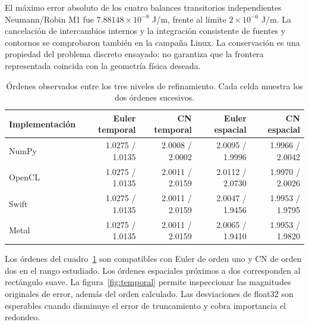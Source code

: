 \documentclass[11pt,a4paper]{article}
\begin{document}
El máximo error absoluto de los cuatro balances transitorios independientes Neumann/Robin M1 fue $7.88148\times10^{-8}$ J/m, frente al límite $2\times10^{-6}$ J/m. La cancelación de intercambios internos y la integración consistente de fuentes y contornos se comprobaron también en la campaña Linux. La conservación es una propiedad del problema discreto ensayado: no garantiza que la frontera representada coincida con la geometría física deseada.

\begin{table}[tbp]\centering\small
\caption{Órdenes observados entre los tres niveles de refinamiento. Cada celda muestra los dos órdenes sucesivos.}\label{tab:orders}
\begin{tabular}{@{}lrrrr@{}}\toprule
Implementación & Euler temporal & CN temporal & Euler espacial & CN espacial\\\midrule
NumPy & 1.0275 / 1.0135 & 2.0008 / 2.0002 & 2.0095 / 1.9996 & 1.9966 / 2.0042\\
OpenCL & 1.0275 / 1.0135 & 2.0011 / 2.0159 & 2.0112 / 2.0730 & 1.9970 / 2.0026\\
Swift & 1.0275 / 1.0135 & 2.0011 / 2.0159 & 2.0047 / 1.9456 & 1.9953 / 1.9795\\
Metal & 1.0275 / 1.0135 & 2.0011 / 2.0159 & 2.0065 / 1.9410 & 1.9953 / 1.9820\\
\bottomrule\end{tabular}\end{table}

Los órdenes del cuadro~\ref{tab:orders} son compatibles con Euler de orden uno y CN de orden dos en el rango estudiado. Los órdenes espaciales próximos a dos corresponden al rectángulo suave. La figura~\ref{fig:temporal} permite inspeccionar las magnitudes originales de error, además del orden calculado. Las desviaciones de float32 son esperables cuando disminuye el error de truncamiento y cobra importancia el redondeo.
\end{document}
